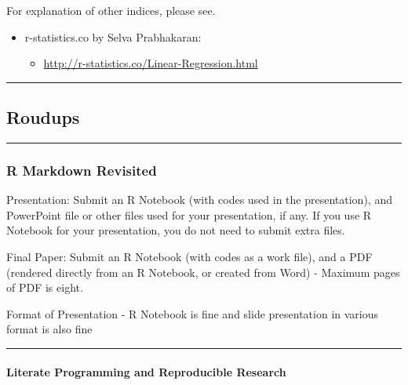 \documentclass[
]{article}
\providecommand{\tightlist}{%
  \setlength{\itemsep}{0pt}\setlength{\parskip}{0pt}}
\begin{document}
For explanation of other indices, please see.

\begin{itemize}
\tightlist
\item
  r-statistics.co by Selva Prabhakaran:

  \begin{itemize}
  \tightlist
  \item
    \url{http://r-statistics.co/Linear-Regression.html}
  \end{itemize}
\end{itemize}

\begin{center}\rule{0.5\linewidth}{0.5pt}\end{center}

\hypertarget{roudups}{%
\subsection{Roudups}\label{roudups}}

\begin{center}\rule{0.5\linewidth}{0.5pt}\end{center}

\hypertarget{r-markdown-revisited}{%
\subsubsection{R Markdown Revisited}\label{r-markdown-revisited}}

Presentation: Submit an R Notebook (with codes used in the
presentation), and PowerPoint file or other files used for your
presentation, if any. If you use R Notebook for your presentation, you
do not need to submit extra files.

Final Paper: Submit an R Notebook (with codes as a work file), and a PDF
(rendered directly from an R Notebook, or created from Word) - Maximum
pages of PDF is eight.

Format of Presentation - R Notebook is fine and slide presentation in
various format is also fine

\begin{center}\rule{0.5\linewidth}{0.5pt}\end{center}

\hypertarget{literate-programming-and-reproducible-research}{%
\paragraph{Literate Programming and Reproducible
Research}\label{literate-programming-and-reproducible-research}}
\end{document}
